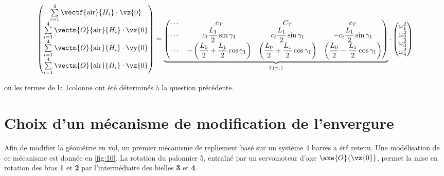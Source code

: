 $$
\begin{pmatrix}
\sum\limits_{i=1}^{4} \vectf{\text{air}}{H_i} \cdot\vz{0} \\
\sum\limits_{i=1}^{4} \vectm{O}{\text{air}}{H_i} \cdot\vx{0} \\
\sum\limits_{i=1}^{4} \vectm{O}{\text{air}}{H_i} \cdot\vy{0} \\
\sum\limits_{i=1}^{4} \vectm{O}{\text{air}}{H_i} \cdot\vz{0} 
\end{pmatrix}
=
\underbrace{\begin{pmatrix}
\cdots & c_T & C_T & c_T  \\
\cdots & c_t \dfrac{L_1}{2} \sin \gamma_1 & c_t \dfrac{L_1}{2} \sin \gamma_1 & - c_t \dfrac{L_1}{2} \sin \gamma_1 \\
\cdots 
& - \left(\dfrac{L_0}{2} + \dfrac{L_1}{2} \cos \gamma_1 \right) 
& \left(\dfrac{L_0}{2}   + \dfrac{L_1}{2} \cos \gamma_1 \right) 
& \left(\dfrac{L_0}{2}   - \dfrac{L_1}{2} \cos \gamma_1 \right) \\ 
\end{pmatrix}}_{\Gamma(\gamma_1)}
\cdot
\begin{pmatrix}
\omega_1^2 \\
\omega_2^2 \\
\omega_3^2 \\
\omega_4^2 \\
\end{pmatrix}
$$

où les termes de la 1\iere colonne ont été déterminés à la question précédente.

\ifprof
\begin{corrige}
\end{corrige}
\else
\fi

\section{\label{sec:02} Choix d’un mécanisme de modification de l’envergure}
Afin de modifier la géométrie en vol, un premier mécanisme de repliement basé sur un système 4 barres a été retenu. Une modélisation de ce mécanisme est donnée en \autoref{fig:10}. La
rotation du palonnier 5, entraîné par un servomoteur d’axe $\axe{O}{\vz{0}}$, permet la mise en rotation
des bras \textbf{1} et \textbf{2} par l’intermédiaire des bielles \textbf{3} et \textbf{4}.

